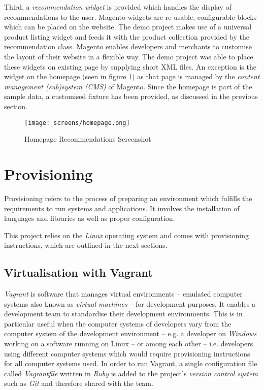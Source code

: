Third, a \emph{recommendation widget} is provided which handles the display of recommendations to the user. Magento widgets are re-usable, configurable blocks which can be placed on the website. The demo project makes use of a universal product listing widget and feeds it with the product collection provided by the recommendation class. Magento enables developers and merchants to customise the layout of their website in a flexible way. The demo project was able to place these widgets on existing page by supplying short XML files. An exception is the widget on the homepage (seen in figure \ref{fig:implementation-magento-homepage}) as that page is managed by the \emph{content management (sub)system (CMS)} of Magento. Since the homepage is part of the sample data, a customised fixture has been provided, as discussed in the previous section.

\begin{figure}[!ht]
    \texttt{[image: screens/homepage.png]}
    \caption{Homepage Recommendations Screenshot}
    \label{fig:implementation-magento-homepage}
\end{figure}

\section{Provisioning}

Provisioning refers to the process of preparing an environment which fulfills the requirements to run systems and applications. It involves the installation of languages and libraries as well as proper configuration.

This project relies on the \emph{Linux} operating system and comes with provisioning instructions, which are outlined in the next sections.

\subsection{Virtualisation with Vagrant}

\emph{Vagrant} is software that manages virtual environments -- emulated computer systems also known as \emph{virtual machines} -- for development purposes. It enables a development team to standardise their development environments. This is in particular useful when the computer systems of developers vary from the computer system of the development environment -- e.g. a developer on \emph{Windows} working on a software running on Linux -- or among each other -- i.e. developers using different computer systems which would require provisioning instructions for all computer systems used. In order to run Vagrant, a single configuration file called \emph{Vagrantfile} written in \emph{Ruby} is added to the project's \emph{version control system} such as \emph{Git} and therefore shared with the team.

